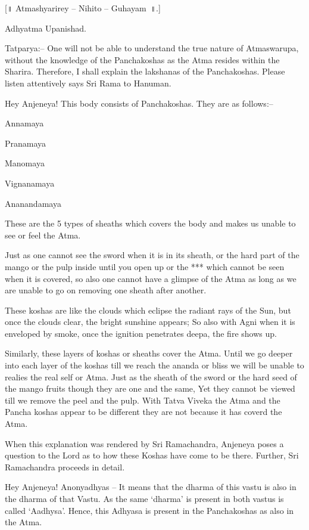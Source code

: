 [॥ Atmashyarirey – Nihito – Guhayam~॥.]

Adhyatma Upanishad.

Tatparya:– One will not be able to understand the true nature of Atmaswarupa, without the knowledge of the Panchakoshas as the Atma resides within the Sharira. Therefore, I shall explain the lakshanas of the Panchakoshas. Please listen attentively says Sri Rama to Hanuman.

Hey Anjeneya! This body consists of Panchakoshas. They are as follows:–

\item Annamaya

 \item Pranamaya

 \item Manomaya

 \item Vignanamaya

 \item Ananandamaya

These are the 5 types of sheaths which covers the body and makes us unable to see or feel the Atma.

Just as one cannot see the sword when it is in its sheath, or the hard part of the mango or the pulp inside until you open up or the *** which cannot be seen when it is covered, so also one cannot have a glimpse of the Atma as long as we are unable to go on removing one sheath after another.

These koshas are like the clouds which eclipse the radiant rays of the Sun, but once the clouds clear, the bright sunshine appears; So also with Agni when it is enveloped by smoke, once the ignition penetrates deepa, the fire shows up.

Similarly, these layers of koshas or sheaths cover the Atma. Until we go deeper into each layer of the koshas till we reach the ananda or bliss we will be unable to realies the real self or Atma. Just as the sheath of the sword or the hard seed of the mango fruits though they are one and the same, Yet they cannot be viewed till we remove the peel and the pulp. With Tatva Viveka the Atma and the Pancha koshas appear to be different they are not because it has coverd the Atma.

When this explanation was rendered by Sri Ramachandra, Anjeneya poses a question to the Lord as to how these Koshas have come to be there. Further, Sri Ramachandra proceeds in detail.

Hey Anjeneya! Anonyadhyas – It means that the dharma of this vastu is also in the dharma of that Vastu. As the same ‘dharma’ is present in both vastus is called ‘Aadhysa’. Hence, this Adhyasa is present in the Panchakoshas as also in the Atma.

